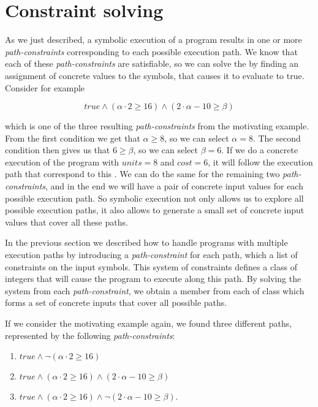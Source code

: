 		
\section{Constraint solving}
	As we just described, a symbolic execution of a program results in one or more \emph{path-constraints} corresponding to each possible execution path. We know that each of these \emph{path-constraints} are satisfiable, so we can solve the \pc by finding an assignment of concrete values to the symbols, that causes it to evaluate to true. Consider for example 
	
	\begin{equation*}
		true \land (\alpha \cdot 2 \geq 16) \land (2\cdot \alpha - 10 \geq \beta)
	\end{equation*}
	
	which is one of the three resulting \emph{path-constraints} from the motivating example. From the first condition we get that $\alpha \geq 8$, so we can select $\alpha = 8$. The second condition then gives us that $6 \geq \beta$, so we can select $\beta = 6$. If we do a concrete execution of the program with $units = 8$ and $cost = 6$, it will follow the execution path that correspond to this \pc. We can do the same for the remaining two \emph{path-constraints}, and in the end we will have a pair of concrete input values for each possible execution path. So symbolic execution not only allows us to explore all possible execution paths, it also allows to generate a small set of concrete input values that cover all these paths.  

	
	\iffalse
	In the previous section we described how to handle programs with multiple execution paths by introducing a \emph{path-constraint} for each path, which a list of constraints on the input symbols. This system of constraints defines a class of integers that will cause the program to execute along this path. By solving the system from each \emph{path-constraint}, we obtain a member from each of class which forms a set of concrete inputs that cover all possible paths.    
	
	If we consider the motivating example again, we found three different paths, represented by the following \emph{path-constraints}:
	\begin{enumerate}
		\item $true \land \neg (\alpha \cdot 2 \geq 16)$
		\item $true \land (\alpha \cdot 2 \geq 16) \land (2\cdot \alpha - 10 \geq \beta)$
		\item $true \land (\alpha \cdot 2 \geq 16) \land \neg (2\cdot \alpha - 10 \geq \beta)$.
	\end{enumerate}
	
